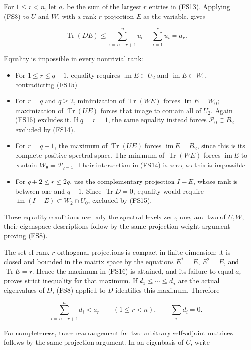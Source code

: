 For \(1\le r<n\), let \(a_r\) be the sum of the largest \(r\) entries in (FS13). Applying (FS8) to \(U\) and \(W\), with a rank-\(r\) projection \(E\) as the variable, gives

\[
\operatorname{Tr}(DE)
\le \sum_{i=n-r+1}^n u_i-\sum_{i=1}^r u_i=a_r.
\tag{FS16}
\]

Equality is impossible in every nontrivial rank:

\begin{itemize}
\tightlist
\item
  For \(1\le r\le q-1\), equality requires \(\operatorname{im}E\subset U_2\) and \(\operatorname{im}E\subset W_0\), contradicting (FS15).
\item
  For \(r=q\) and \(q\ge2\), minimization of \(\operatorname{Tr}(WE)\) forces \(\operatorname{im}E=W_0\); maximization of \(\operatorname{Tr}(UE)\) forces that image to contain all of \(U_2\). Again (FS15) excludes it. If \(q=r=1\), the same equality instead forces \(\mathcal P_0\subset B_2\), excluded by (FS14).
\item
  For \(r=q+1\), the maximum of \(\operatorname{Tr}(UE)\) forces \(\operatorname{im}E=B_2\), since this is its complete positive spectral space. The minimum of \(\operatorname{Tr}(WE)\) forces \(\operatorname{im}E\) to contain \(W_0=\mathcal P_{q-1}\). Their intersection in (FS14) is zero, so this is impossible.
\item
  For \(q+2\le r\le2q\), use the complementary projection \(I-E\), whose rank is between one and \(q-1\). Since \(\operatorname{Tr}D=0\), equality would require \(\operatorname{im}(I-E)\subset W_2\cap U_0\), excluded by (FS15).
\end{itemize}

These equality conditions use only the spectral levels zero, one, and two of \(U,W\); their eigenspace descriptions follow by the same projection-weight argument proving (FS8).

The set of rank-\(r\) orthogonal projections is compact in finite dimension: it is closed and bounded in the matrix space by the equations \(E^*=E\), \(E^2=E\), and \(\operatorname{Tr}E=r\). Hence the maximum in (FS16) is attained, and its failure to equal \(a_r\) proves strict inequality for that maximum. If \(d_1\le\cdots\le d_n\) are the actual eigenvalues of \(D\), (FS8) applied to \(D\) identifies this maximum. Therefore

\[
\sum_{i=n-r+1}^n d_i<a_r
\qquad(1\le r<n),\qquad \sum_i d_i=0.
\tag{FS17}
\]

For completeness, trace rearrangement for two arbitrary self-adjoint matrices follows by the same projection argument. In an eigenbasis of \(C\), write

